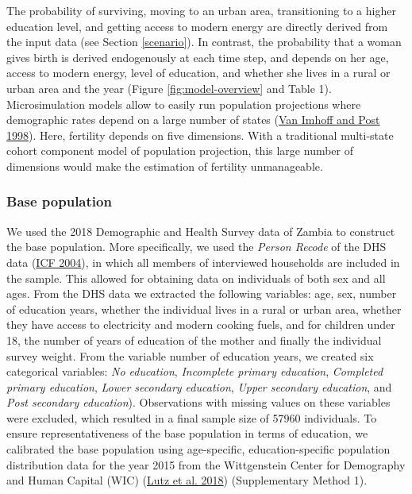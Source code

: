 \documentclass[
]{article}
\begin{document}
The probability of surviving, moving to an urban area, transitioning to a higher education level, and getting access to modern energy are directly derived from the input data (see Section \ref{scenario}). In contrast, the probability that a woman gives birth is derived endogenously at each time step, and depends on her age, access to modern energy, level of education, and whether she lives in a rural or urban area and the year (Figure \ref{fig:model-overview} and Table 1). Microsimulation models allow to easily run population projections where demographic rates depend on a large number of states (\protect\hyperlink{ref-van_imhoff_microsimulation_1998}{Van Imhoff and Post 1998}). Here, fertility depends on five dimensions. With a traditional multi-state cohort component model of population projection, this large number of dimensions would make the estimation of fertility unmanageable.

\hypertarget{base-population}{%
\subsubsection{Base population}\label{base-population}}

We used the 2018 Demographic and Health Survey data of Zambia to construct the base population. More specifically, we used the \emph{Person Recode} of the DHS data (\protect\hyperlink{ref-icf_demographic_2004}{ICF 2004}), in which all members of interviewed households are included in the sample. This allowed for obtaining data on individuals of both sex and all ages. From the DHS data we extracted the following variables: age, sex, number of education years, whether the individual lives in a rural or urban area, whether they have access to electricity and modern cooking fuels, and for children under 18, the number of years of education of the mother and finally the individual survey weight. From the variable number of education years, we created six categorical variables: \emph{No education}, \emph{Incomplete primary education}, \emph{Completed primary education}, \emph{Lower secondary education}, \emph{Upper secondary education}, and \emph{Post secondary education}). Observations with missing values on these variables were excluded, which resulted in a final sample size of 57960 individuals. To ensure representativeness of the base population in terms of education, we calibrated the base population using age-specific, education-specific population distribution data for the year 2015 from the Wittgenstein Center for Demography and Human Capital (WIC) (\protect\hyperlink{ref-lutz_demographic_2018}{Lutz et al. 2018}) (Supplementary Method 1).
\end{document}
